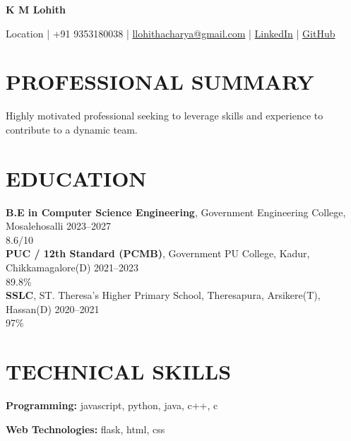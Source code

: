 \documentclass[10pt,a4paper]{extarticle}
\begin{document}

\begin{center}

{\Large \textbf{K M Lohith}}

\vspace{1pt}

Location |
+91 9353180038 |
\href{mailto:llohithacharya@gmail.com}{llohithacharya@gmail.com} |
\href{https://linkedin.com/in/username}{LinkedIn} |
\href{https://github.com/username}{GitHub}

\end{center}


\section*{PROFESSIONAL SUMMARY}

Highly motivated professional seeking to leverage skills and experience to contribute to a dynamic team.


\section*{EDUCATION}

\noindent \textbf{B.E in Computer Science Engineering}, Government Engineering College, Mosalehosalli \hfill 2023–2027\\
\null \hfill 8.6/10\\
\noindent \textbf{PUC / 12th Standard (PCMB)}, Government PU College, Kadur, Chikkamagalore(D) \hfill 2021–2023\\
\null \hfill 89.8\%\\
\noindent \textbf{SSLC}, ST. Theresa’s Higher Primary School, Theresapura, Arsikere(T), Hassan(D) \hfill 2020–2021\\
\null \hfill 97\%\\



\section*{TECHNICAL SKILLS}

\textbf{Programming:} javascript, python, java, c++, c

\textbf{Web Technologies:} flask, html, css
\end{document}
